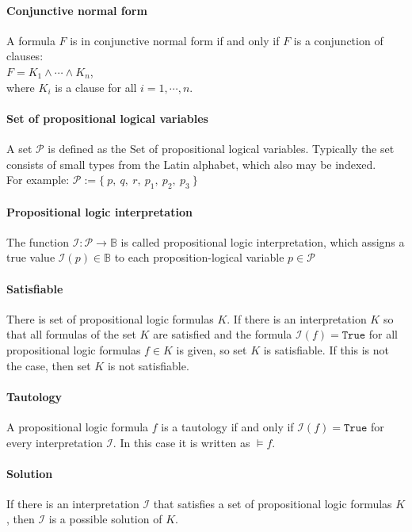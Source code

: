 \paragraph{Conjunctive normal form} A formula $F$ is in conjunctive normal form if and only if $F$ is a conjunction of clauses:
\\[0.2cm]
\hspace*{1.3cm} $F = K_1 \land \cdots \land K_n$, \\[0.2cm]
where $K_i$ is a clause for all $i = 1, \cdots, n$.

\paragraph{Set of propositional logical variables}
A set $\mathcal{P}$ is defined as the Set of propositional logical variables. Typically the set consists of small types from the Latin alphabet, which also may be indexed.\\
For example: $\mathcal{P} := \{\ p,\ q,\ r,\ p_1,\ p_2,\ p_3\ \}$ 

\paragraph{Propositional logic interpretation}
The function $\mathcal{I} : \mathcal{P} \rightarrow \mathbb{B}$ is called propositional logic interpretation, which assigns a true value $\mathcal{I}(p) \in \mathbb{B}$ to each proposition-logical variable $p\in \mathcal{P}$

\paragraph{Satisfiable}
There is set of propositional logic formulas $K$. If there is an interpretation $K$ so that all formulas of the set $K$ are satisfied and the formula $\mathcal{I}(f) = \texttt{True}$ for all propositional logic formulas $f \in K$ is given, so set $K$ is satisfiable. If this is not the case, then set $K$ is not satisfiable.

\paragraph{Tautology}
A propositional logic formula $f$ is a tautology if and only if $\mathcal{I}(f) = \texttt{True}$ for every interpretation $\mathcal{I}$. In this case it is written as $\models f$.

\paragraph{Solution}
If there is an interpretation $\mathcal{I}$ that satisfies a set of propositional logic formulas $K$, then $\mathcal{I}$ is a possible solution of $K$.

